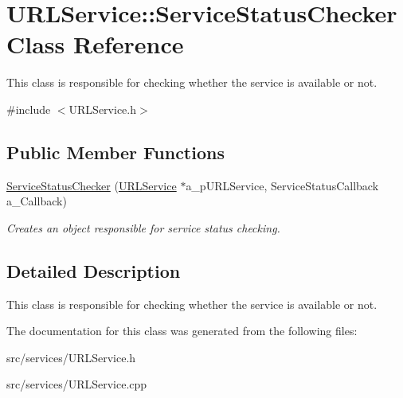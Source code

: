 \hypertarget{class_u_r_l_service_1_1_service_status_checker}{}\section{U\+R\+L\+Service\+:\+:Service\+Status\+Checker Class Reference}
\label{class_u_r_l_service_1_1_service_status_checker}


This class is responsible for checking whether the service is available or not.  




{\ttfamily \#include $<$U\+R\+L\+Service.\+h$>$}

\subsection*{Public Member Functions}
\begin{DoxyCompactItemize}
\item 
\mbox{\label{class_u_r_l_service_1_1_service_status_checker_ab1f3cbd6fcdd4cf8791b90d814facc31}} 
\hyperlink{class_u_r_l_service_1_1_service_status_checker_ab1f3cbd6fcdd4cf8791b90d814facc31}{Service\+Status\+Checker} (\hyperlink{class_u_r_l_service}{U\+R\+L\+Service} $\ast$a\+\_\+p\+U\+R\+L\+Service, Service\+Status\+Callback a\+\_\+\+Callback)
\begin{DoxyCompactList}\small\item\em Creates an object responsible for service status checking. \end{DoxyCompactList}\end{DoxyCompactItemize}


\subsection{Detailed Description}
This class is responsible for checking whether the service is available or not. 

The documentation for this class was generated from the following files\+:\begin{DoxyCompactItemize}
\item 
src/services/U\+R\+L\+Service.\+h\item 
src/services/U\+R\+L\+Service.\+cpp\end{DoxyCompactItemize}

